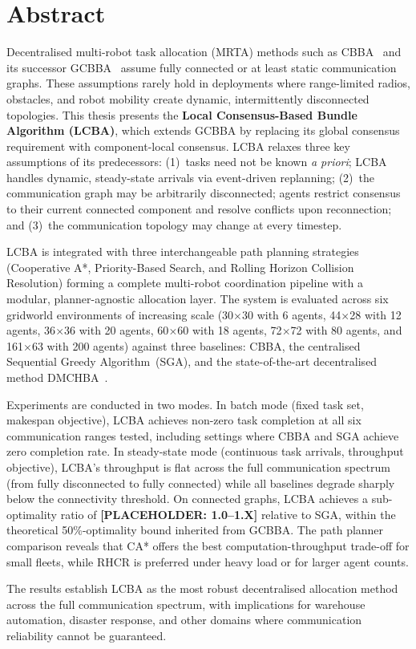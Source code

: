 \chapter*{Abstract}

Decentralised multi-robot task allocation (MRTA) methods such as
CBBA~\cite{choi2009consensus} and its successor
GCBBA~\cite{kha2025enhancing} assume fully connected or at least static
communication graphs.
These assumptions rarely hold in deployments where range-limited radios,
obstacles, and robot mobility create dynamic, intermittently disconnected
topologies.
This thesis presents the \textbf{Local Consensus-Based Bundle Algorithm (LCBA)},
which extends GCBBA by replacing its global consensus requirement with
component-local consensus.
LCBA relaxes three key assumptions of its predecessors:
(1)~tasks need not be known \emph{a priori}; LCBA handles dynamic,
steady-state arrivals via event-driven replanning;
(2)~the communication graph may be arbitrarily disconnected; agents restrict
consensus to their current connected component and resolve conflicts upon
reconnection; and
(3)~the communication topology may change at every timestep.

LCBA is integrated with three interchangeable path planning strategies
(Cooperative A*, Priority-Based Search, and Rolling Horizon Collision
Resolution) forming a complete multi-robot coordination pipeline with a
modular, planner-agnostic allocation layer.
The system is evaluated across six gridworld environments of increasing scale
(30$\times$30 with 6 agents, 44$\times$28 with 12 agents, 36$\times$36 with
20 agents, 60$\times$60 with 18 agents, 72$\times$72 with 80 agents, and
161$\times$63 with 200 agents) against three baselines: CBBA, the centralised
Sequential Greedy Algorithm~(SGA), and the state-of-the-art decentralised
method DMCHBA~\cite{samiei2024dmchba}.

Experiments are conducted in two modes.
In batch mode (fixed task set, makespan objective), LCBA achieves
non-zero task completion at all six communication ranges tested, including
settings where CBBA and SGA achieve zero completion rate.
In steady-state mode (continuous task arrivals, throughput objective),
LCBA's throughput is flat across the full communication spectrum
(from fully disconnected to fully connected) while all baselines degrade
sharply below the connectivity threshold.
On connected graphs, LCBA achieves a sub-optimality ratio of
\textbf{[PLACEHOLDER: 1.0--1.X]} relative to SGA, within the theoretical
50\%-optimality bound inherited from GCBBA.
The path planner comparison reveals that CA* offers the best
computation-throughput trade-off for small fleets, while RHCR is preferred
under heavy load or for larger agent counts.

The results establish LCBA as the most robust decentralised allocation
method across the full communication spectrum, with implications for
warehouse automation, disaster response, and other domains where
communication reliability cannot be guaranteed.
